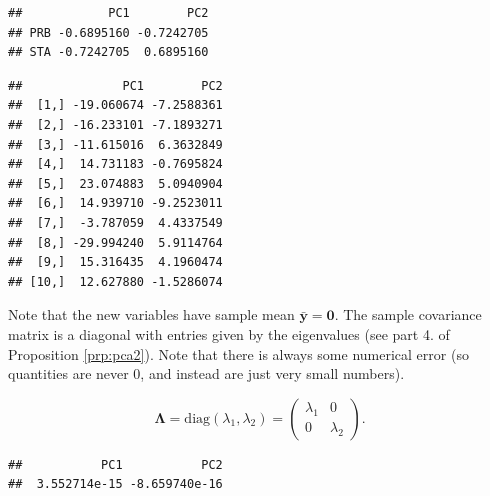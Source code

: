 \documentclass[
]{book}
\newenvironment{Shaded}{\begin{snugshade}}{\end{snugshade}}
\newcommand{\CommentTok}[1]{\textcolor[rgb]{0.56,0.35,0.01}{\textit{#1}}}
\newcommand{\DecValTok}[1]{\textcolor[rgb]{0.00,0.00,0.81}{#1}}
\newcommand{\FunctionTok}[1]{\textcolor[rgb]{0.13,0.29,0.53}{\textbf{#1}}}
\newcommand{\NormalTok}[1]{#1}
\newcommand{\SpecialCharTok}[1]{\textcolor[rgb]{0.81,0.36,0.00}{\textbf{#1}}}
\theoremstyle{definition}
\theoremstyle{definition}
\theoremstyle{definition}
\theoremstyle{definition}
\theoremstyle{remark}
\begin{document}
\begin{verbatim}
##            PC1        PC2
## PRB -0.6895160 -0.7242705
## STA -0.7242705  0.6895160
\end{verbatim}

\begin{Shaded}
\end{Shaded}

\begin{verbatim}
##              PC1        PC2
##  [1,] -19.060674 -7.2588361
##  [2,] -16.233101 -7.1893271
##  [3,] -11.615016  6.3632849
##  [4,]  14.731183 -0.7695824
##  [5,]  23.074883  5.0940904
##  [6,]  14.939710 -9.2523011
##  [7,]  -3.787059  4.4337549
##  [8,] -29.994240  5.9114764
##  [9,]  15.316435  4.1960474
## [10,]  12.627880 -1.5286074
\end{verbatim}

Note that the new variables have sample mean \(\bar{\mathbf y}={\boldsymbol 0}\). The sample covariance matrix is a diagonal with entries given by the eigenvalues (see part 4. of Proposition \ref{prp:pca2}). Note that there is always some numerical error (so quantities are never 0, and instead are just very small numbers).

\[
\boldsymbol \Lambda= \text{diag}(\lambda_1,\lambda_2) =  \begin{pmatrix} \lambda_1 & 0 \\ 0 & \lambda_2 \end{pmatrix}.
\]

\begin{Shaded}
\end{Shaded}

\begin{verbatim}
##           PC1           PC2 
##  3.552714e-15 -8.659740e-16
\end{verbatim}

\begin{Shaded}
\end{Shaded}
\end{document}
